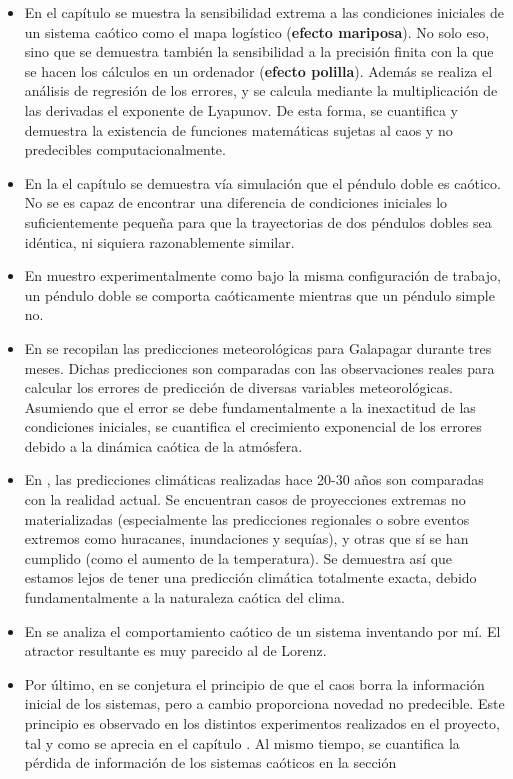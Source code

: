 \documentclass[
  10pt,
  a4paper,
  DIV=11,
  numbers=noendperiod,
  open=any]{scrreprt}
\numberwithin{equation}{chapter}
\numberwithin{equation}{section}
\renewcommand{\[}{\begin{equation}}
\renewcommand{\]}{\end{equation}}
\begin{document}
\begin{itemize}
\item
  En el capítulo  se muestra la sensibilidad extrema a las condiciones
  iniciales de un sistema caótico como el mapa logístico (\textbf{efecto
  mariposa}). No solo eso, sino que se demuestra también la sensibilidad
  a la precisión finita con la que se hacen los cálculos en un ordenador
  (\textbf{efecto polilla}). Además se realiza el análisis de regresión
  de los errores, y se calcula mediante la multiplicación de las
  derivadas el exponente de Lyapunov. De esta forma, se cuantifica y
  demuestra la existencia de funciones matemáticas sujetas al caos y no
  predecibles computacionalmente.
\item
  En la el capítulo  se demuestra vía simulación que el péndulo doble es caótico.
  No se es capaz de encontrar una diferencia de condiciones iniciales lo
  suficientemente pequeña para que la trayectorias de dos péndulos
  dobles sea idéntica, ni siquiera razonablemente similar. 
\item
  En 
  muestro experimentalmente como bajo la misma configuración de trabajo, un péndulo doble
  se comporta caóticamente mientras que un péndulo simple no.
\item
  En  se recopilan las predicciones
  meteorológicas para Galapagar durante tres meses. Dichas predicciones
  son comparadas con las observaciones reales para calcular los errores
  de predicción de diversas variables meteorológicas. Asumiendo que el
  error se debe fundamentalmente a la inexactitud de las condiciones
  iniciales, se cuantifica el crecimiento exponencial de los errores
  debido a la dinámica caótica de la atmósfera.
\item
  En
  , las predicciones climáticas
  realizadas hace 20-30 años son comparadas con la realidad actual. Se
  encuentran casos de proyecciones extremas no materializadas
  (especialmente las predicciones regionales o sobre eventos extremos
  como huracanes, inundaciones y sequías), y otras que sí se han
  cumplido (como el aumento de la temperatura). Se demuestra así que
  estamos lejos de tener una predicción climática totalmente exacta, debido
  fundamentalmente a la naturaleza caótica del clima.
\item
  En
   se analiza el comportamiento caótico de un
  sistema inventando por mí. El atractor resultante es muy parecido al
  de Lorenz.
\item
  Por último, en  se conjetura el principio de que el caos borra la
  información inicial de los sistemas, pero a cambio proporciona novedad
  no predecible. Este principio es observado en los distintos
  experimentos realizados en el proyecto, tal y como se aprecia en el capítulo . Al mismo tiempo, se cuantifica la pérdida de información de los sistemas caóticos en la sección  
\end{itemize}
\end{document}
